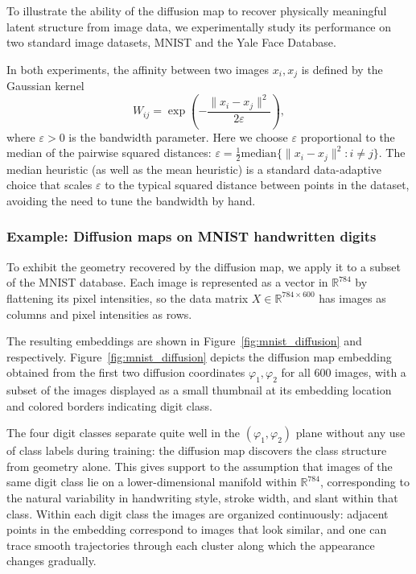 To illustrate the ability of the diffusion map to recover physically meaningful
latent structure from image data, we experimentally study its performance on two standard image datasets, MNIST and the Yale Face Database.

In both experiments, the affinity between two images 
$x_i, x_j$ is defined by the Gaussian kernel
$$
W_{ij} = \exp\!\left(-\frac{\|x_i - x_j\|^2}{2\varepsilon}\right),
$$
where $\varepsilon > 0$ is the bandwidth parameter. Here we choose $\varepsilon$ proportional to the median of the pairwise squared distances: $\varepsilon = \frac{1}{2}\mathrm{median}\bigl\{\|x_i - x_j\|^2 : i \neq j\bigr\}$.
The median heuristic (as well as the mean heuristic) is a standard data-adaptive choice that scales $\varepsilon$ to the typical squared distance between points in the dataset, avoiding the need to tune the bandwidth by hand.





\subsubsection{Example: Diffusion maps on MNIST handwritten digits}

To exhibit the geometry recovered by the diffusion map, we apply it to a subset of the MNIST database. Each image is represented as a vector in $\mathbb{R}^{784}$ by flattening its pixel intensities, so the data matrix $X \in \mathbb{R}^{784 \times 600}$
has images as columns and pixel intensities as rows. 


The resulting embeddings are shown in Figure~\ref{fig:mnist_diffusion} and respectively.
Figure~\ref{fig:mnist_diffusion} depicts the diffusion map 
 embedding obtained from the first two diffusion coordinates $\varphi_1, \varphi_2$ for all 
600 images, with a subset of the images displayed as a small thumbnail at its embedding location and colored borders indicating digit class. 

The four digit classes separate quite well in the $(\varphi_1, \varphi_2)$ plane without any use of class labels during training: the diffusion map discovers the class structure from geometry alone. This gives support to the assumption that images of the same digit class lie on a lower-dimensional manifold within $\mathbb{R}^{784}$, corresponding to the natural variability in handwriting style, stroke width, and slant within that class. Within each digit class the images are organized continuously: adjacent points in the embedding correspond to images that look similar, and one can trace smooth trajectories through each cluster along which the appearance changes gradually.


